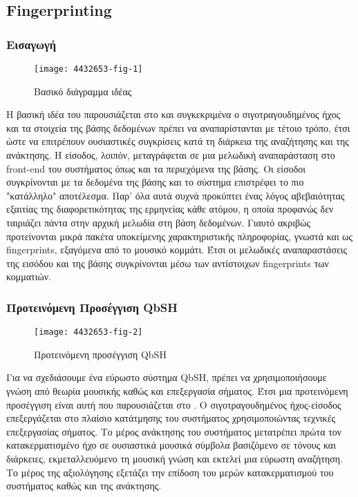 \newcommand*{\fp}{Fingerprinting}%
\newcommand*{\fps}{fingerprints}%
\subsection{\fp{}}\label{sub:fingerprinting}

\subsubsection{Εισαγωγή}
\begin{wrapfigure}{r}{0.5\textwidth}
        \centering
        \vspace{-20pt}\texttt{[image: 4432653-fig-1]}
        \vspace{-20pt}\caption{Βασικό διάγραμμα ιδέας}
        \label{fig:4432653-fig-1}
\end{wrapfigure}
Η βασική ιδέα του \cite{fingerapproach2008} παρουσιάζεται στο  και συγκεκριμένα ο σιγοτραγουδημένος ήχος και τα στοιχεία της βάσης δεδομένων πρέπει να αναπαρίστανται με τέτοιο τρόπο, έτσι ώστε να επιτρέπουν ουσιαστικές συγκρίσεις κατά τη διάρκεια της αναζήτησης και της ανάκτησης. Η είσοδος, λοιπόν, μεταγράφεται σε μια μελωδική αναπαράσταση στο front-end του συστήματος όπως και τα περιεχόμενα της βάσης. Οι είσοδοι συγκρίνονται με τα δεδομένα της βάσης και το σύστημα επιστρέφει το πιο "κατάλληλο" αποτέλεσμα. Παρ' όλα αυτά συχνά προκύπτει ένας λόγος αβεβαιότητας εξαιτίας της διαφορετικότητας της ερμηνείας κάθε ατόμου, η οποία προφανώς δεν ταιριάζει πάντα στην αρχική μελωδία στη βάση δεδομένων. Γιαυτό ακριβώς προτείνονται μικρά πακέτα υποκείμενης χαρακτηριστικής πληροφορίας, γνωστά και ως \fps{}, εξαγόμενα από το μουσικό κομμάτι. Έτσι οι μελωδικές αναπαραστάσεις της εισόδου και της βάσης συγκρίνονται μέσω των αντίστοιχων \fps{} των κομματιών.

\subsubsection{Προτεινόμενη Προσέγγιση QbSH}
\begin{wrapfigure}[9]{r}{0.5\textwidth}
        \centering
        \vspace{-20pt}\texttt{[image: 4432653-fig-2]}
        \vspace{-20pt}\caption{Προτεινόμενη προσέγγιση QbSH}
        \label{fig:4432653-fig-2}
\end{wrapfigure}
Για να σχεδιάσουμε ένα εύρωστο σύστημα QbSH, πρέπει να χρησιμοποιήσουμε γνώση από θεωρία μουσικής καθώς και επεξεργασία σήματος. Έτσι μια προτεινόμενη προσέγγιση είναι αυτή που παρουσιάζεται στο . Ο σιγοτραγουδημένος ήχος-είσοδος επεξεργάζεται στο πλαίσιο κατάτμησης του συστήματος χρησιμοποιώντας τεχνικές επεξεργασίας σήματος. Το μέρος ανάκτησης του συστήματος μετατρέπει πρώτα τον κατακερματισμένο ήχο σε ουσιαστικά μουσικά σύμβολα βασιζόμενο σε τόνους και διάρκειες, εκμεταλλευόμενο τη μουσική γνώση και εκτελεί μια εύρωστη αναζήτηση. Το μέρος της αξιολόγησης εξετάζει την επίδοση του μερών κατακερματισμού του συστήματος καθώς και της ανάκτησης.

